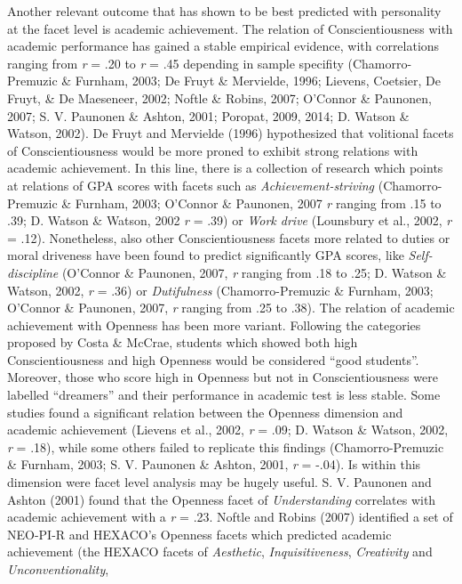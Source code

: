 \documentclass[,man,floatsintext]{apa6}
\begin{document}
Another relevant outcome that has shown to be best predicted with
personality at the facet level is academic achievement. The relation of
Conscientiousness with academic performance has gained a stable
empirical evidence, with correlations ranging from \emph{r} = .20 to
\emph{r} = .45 depending in sample specifity (Chamorro-Premuzic \&
Furnham, 2003; De Fruyt \& Mervielde, 1996; Lievens, Coetsier, De Fruyt,
\& De Maeseneer, 2002; Noftle \& Robins, 2007; O'Connor \& Paunonen,
2007; S. V. Paunonen \& Ashton, 2001; Poropat, 2009, 2014; D. Watson \&
Watson, 2002). De Fruyt and Mervielde (1996) hypothesized that
volitional facets of Conscientiousness would be more proned to exhibit
strong relations with academic achievement. In this line, there is a
collection of research which points at relations of GPA scores with
facets such as \emph{Achievement-striving} (Chamorro-Premuzic \&
Furnham, 2003; O'Connor \& Paunonen, 2007 \emph{r} ranging from .15 to
.39; D. Watson \& Watson, 2002 \emph{r} = .39) or \emph{Work drive}
(Lounsbury et al., 2002, \emph{r} = .12). Nonetheless, also other
Conscientiousness facets more related to duties or moral driveness have
been found to predict significantly GPA scores, like
\emph{Self-discipline} (O'Connor \& Paunonen, 2007, \emph{r} ranging
from .18 to .25; D. Watson \& Watson, 2002, \emph{r} = .36) or
\emph{Dutifulness} (Chamorro-Premuzic \& Furnham, 2003; O'Connor \&
Paunonen, 2007, \emph{r} ranging from .25 to .38). The relation of
academic achievement with Openness has been more variant. Following the
categories proposed by Costa \& McCrae, students which showed both high
Conscientiousness and high Openness would be considered \enquote{good
students}. Moreover, those who score high in Openness but not in
Conscientiousness were labelled \enquote{dreamers} and their performance
in academic test is less stable. Some studies found a significant
relation between the Openness dimension and academic achievement
(Lievens et al., 2002, \emph{r} = .09; D. Watson \& Watson, 2002,
\emph{r} = .18), while some others failed to replicate this findings
(Chamorro-Premuzic \& Furnham, 2003; S. V. Paunonen \& Ashton, 2001,
\emph{r} = -.04). Is within this dimension were facet level analysis may
be hugely useful. S. V. Paunonen and Ashton (2001) found that the
Openness facet of \emph{Understanding} correlates with academic
achievement with a \emph{r} = .23. Noftle and Robins (2007) identified a
set of NEO-PI-R and HEXACO's Openness facets which predicted academic
achievement (the HEXACO facets of \emph{Aesthetic},
\emph{Inquisitiveness}, \emph{Creativity} and \emph{Unconventionality},
\end{document}
